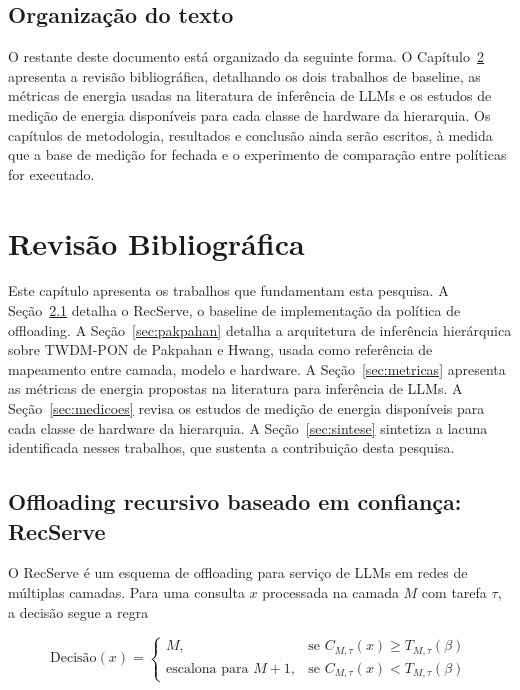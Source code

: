 \documentclass[cic,dipl]{infufrgs}
\begin{document}
\section{Organiza\c{c}\~ao do texto}

O restante deste documento est\'a organizado da seguinte forma. O
Cap\'itulo~\ref{cap:revisao} apresenta a revis\~ao bibliogr\'afica,
detalhando os dois trabalhos de baseline, as m\'etricas de energia
usadas na literatura de infer\^encia de LLMs e os estudos de medi\c{c}\~ao
de energia dispon\'iveis para cada classe de hardware da hierarquia. Os
cap\'itulos de metodologia, resultados e conclus\~ao ainda ser\~ao
escritos, \`a medida que a base de medi\c{c}\~ao for fechada e o
experimento de compara\c{c}\~ao entre pol\'iticas for executado.

\chapter{Revis\~ao Bibliogr\'afica}
\label{cap:revisao}

Este cap\'itulo apresenta os trabalhos que fundamentam esta pesquisa. A
Se\c{c}\~ao~\ref{sec:recserve} detalha o RecServe, o baseline de
implementa\c{c}\~ao da pol\'itica de offloading. A
Se\c{c}\~ao~\ref{sec:pakpahan} detalha a arquitetura de infer\^encia
hier\'arquica sobre TWDM-PON de Pakpahan e Hwang, usada como refer\^encia
de mapeamento entre camada, modelo e hardware. A
Se\c{c}\~ao~\ref{sec:metricas} apresenta as m\'etricas de energia
propostas na literatura para infer\^encia de LLMs. A
Se\c{c}\~ao~\ref{sec:medicoes} revisa os estudos de medi\c{c}\~ao de
energia dispon\'iveis para cada classe de hardware da hierarquia. A
Se\c{c}\~ao~\ref{sec:sintese} sintetiza a lacuna identificada nesses
trabalhos, que sustenta a contribui\c{c}\~ao desta pesquisa.

\section{Offloading recursivo baseado em confian\c{c}a: RecServe}
\label{sec:recserve}

O RecServe \cite{wu2025recserve} \'e um esquema de offloading para
servi\c{c}o de LLMs em redes de m\'ultiplas camadas. Para uma consulta
$x$ processada na camada $M$ com tarefa $\tau$, a decis\~ao segue a
regra

\begin{equation}
  \text{Decis\~ao}(x) =
  \begin{cases}
    M, & \text{se } C_{M,\tau}(x) \geq T_{M,\tau}(\beta) \\
    \text{escalona para } M+1, & \text{se } C_{M,\tau}(x) < T_{M,\tau}(\beta)
  \end{cases}
\end{equation}
\end{document}
